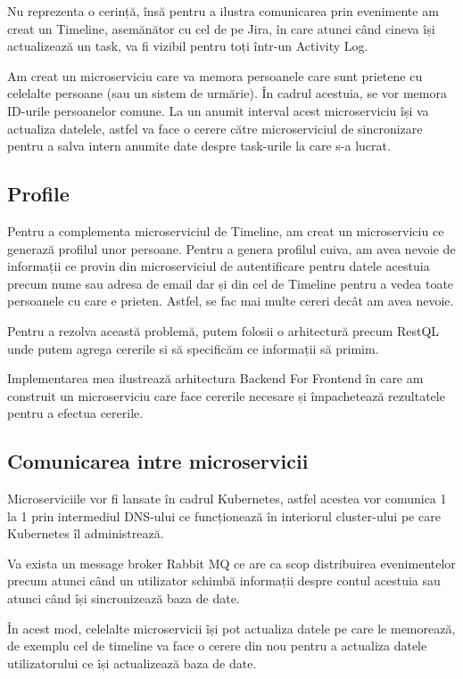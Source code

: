 Nu reprezenta o cerință, însă pentru a ilustra comunicarea prin evenimente am creat un Timeline, asemănător cu cel
de pe Jira, în care atunci când cineva își actualizează un task, va fi vizibil pentru toți într-un Activity Log.

Am creat un microserviciu care va memora persoanele care sunt prietene cu celelalte persoane (sau un sistem de urmărie).
În cadrul acestuia, se vor memora ID-urile persoanelor comune. La un anumit interval acest microserviciu își va actualiza datelele,
astfel va face o cerere către microserviciul de sincronizare pentru a salva intern anumite date despre task-urile la care s-a lucrat.

\subsection{Profile}

Pentru a complementa microserviciul de Timeline, am creat un microserviciu ce generază profilul unor persoane.
Pentru a genera profilul cuiva, am avea nevoie de informații ce provin din microserviciul de autentificare pentru
datele acestuia precum nume sau adresa de email dar și din cel de Timeline pentru a vedea toate persoanele
cu care e prieten. Astfel, se fac mai multe cereri decât am avea nevoie.

Pentru a rezolva această problemă, putem folosii o arhitectură precum RestQL unde
putem agrega cererile si să specificăm ce informații să primim.

Implementarea mea ilustrează arhitectura Backend For Frontend în care am construit un microserviciu
care face cererile necesare și împachetează rezultatele pentru a efectua cererile.

\subsection{Comunicarea intre microservicii}

Microserviciile vor fi lansate în cadrul Kubernetes, astfel acestea vor comunica 1 la 1 prin intermediul
DNS-ului ce funcționează în interiorul cluster-ului pe care Kubernetes îl administrează.

Va exista un message broker Rabbit MQ ce are ca scop distribuirea evenimentelor precum atunci când
un utilizator schimbă informații despre contul acestuia sau atunci când își sincronizează baza de date.

În acest mod, celelalte microservicii își pot actualiza datele pe care le memorează,
de exemplu cel de timeline va face o cerere din nou pentru a actualiza datele utilizatorului ce își actualizează baza de date.

